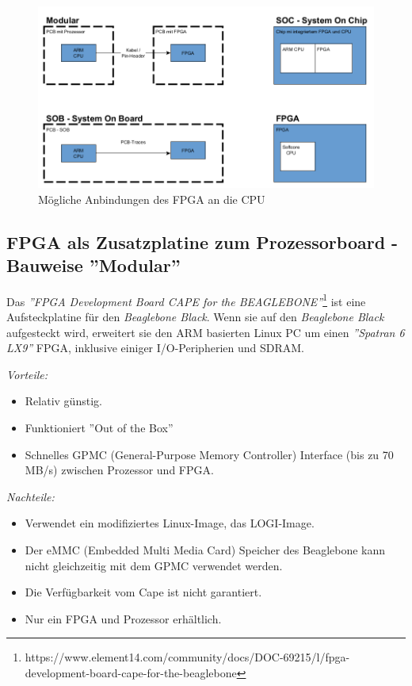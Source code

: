 \begin{figure}[htbp]
	\centering
		\includegraphics[width=\textwidth,height=\textheight,keepaspectratio]{graphs/bauformen.png}
	\caption[]{Mögliche Anbindungen des FPGA an die CPU}
	\label{fig:anbindungFPG}
\end{figure}


\subsection{FPGA als Zusatzplatine zum Prozessorboard - Bauweise ''Modular''}
Das \textit{''FPGA Development Board CAPE for the BEAGLEBONE''}\footnote{https://www.element14.com/community/docs/DOC-69215/l/fpga-development-board-cape-for-the-beaglebone} ist eine Aufsteckplatine für den \textit{Beaglebone Black}.
Wenn sie auf den \textit{Beaglebone Black} aufgesteckt wird, erweitert sie den ARM basierten Linux PC um einen \textit{''Spatran 6 LX9''} FPGA, inklusive einiger I/O-Peripherien und SDRAM.

\textit{Vorteile:}
\begin{itemize}
	\item Relativ günstig.
	\item Funktioniert ''Out of the Box''
	\item Schnelles GPMC (General-Purpose Memory Controller) Interface (bis zu 70 MB/s) zwischen Prozessor und FPGA.
\end{itemize}

\textit{Nachteile:}
\begin{itemize}
	\item Verwendet ein modifiziertes Linux-Image, das LOGI-Image.
	\item Der eMMC (Embedded Multi Media Card) Speicher des Beaglebone kann nicht gleichzeitig mit dem GPMC verwendet werden.
	\item Die Verfügbarkeit vom Cape ist nicht garantiert.
	\item Nur ein FPGA und Prozessor erhältlich.
\end{itemize}

